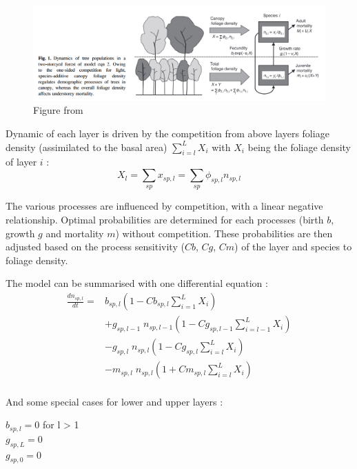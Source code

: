 \documentclass{article}
\begin{document}
\begin{figure}[h]
    \centering
    \includegraphics[width=\textwidth]{Figure/Fig_model_Kohyama.png}
    \caption{Figure from ~\autocite{kohyamaOnesidedCompetitionLight2012}}
    \label{fig:fig_model}
\end{figure}

Dynamic of each layer is driven by the competition from above layers foliage density (assimilated to the basal area) $\sum_{i = l}^{L} X_i$ with $X_i$ being the foliage density of layer $i$ :
\begin{equation}
    X_{l} = \sum_{sp} x_{sp,l} = \sum_{sp} \phi_{sp,l} n_{sp,l}
\end{equation}

The various processes are influenced by competition, with a linear negative relationship. Optimal probabilities are determined for each processes (birth $b$, growth $g$ and mortality $m$) without competition. These probabilities are then adjusted based on the process sensitivity ($Cb$, $Cg$, $Cm$) of the layer and species to foliage density.

\noindent The model can be summarised with one differential equation : \\
\begin{equation}\label{eq:model_general}
    \begin{split}
    \frac{dn_{sp,l}}{dt} = & 
    b_{sp,l} (1 - Cb_{sp,l} \sum_{i = 1}^{L} X_{i}) \\
    & + g_{sp,l - 1} \; n_{sp,l-1} (1 - Cg_{sp,l-1} \sum_{i = l-1}^{L} X_{i}) \\
    & - g_{sp,l} \; n_{sp,l} (1 - Cg_{sp,l} \sum_{i = l}^{L} X_{i}) \\
    & - m_{sp,l} \; n_{sp,l}(1 + Cm_{sp,l} \sum_{i = l}^{L} X_{i})
    \end{split}
\end{equation}
\\
And some special cases for lower and upper layers : \\
\begin{center}
    $b_{sp,l} = 0$ for l > 1 \\
    $g_{sp,L} = 0$ \\
    $g_{sp,0} = 0$
\end{center}
\end{document}

